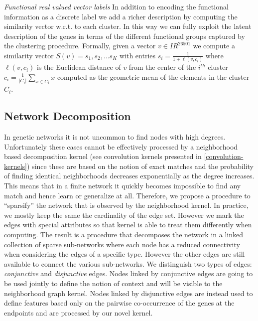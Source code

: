 \documentclass[review]{elsarticle}
\begin{document}
\textit{Functional real valued vector labels}
In addition to encoding the functional information as a discrete label we add a richer description by computing the similarity vector w.r.t. to each cluster. In this way we can fully exploit the latent description of the genes in terms of the different functional groups captured by the clustering procedure. Formally, given a vector $v \in I\!R^{26501}$ we compute a similarity vector $S(v)= {s_1, s_2, \ldots s_K}$ with entries $s_i = \frac{1}{1+ \ell(v,c_i)}$ where $\ell(v,c_i)$ is the Euclidean distance of $v$ from the center of the $i^{th}$ cluster $c_i = \frac{1}{|C_i|}\sum_{x \in C_i} x$ computed as the geometric mean of the elements in the cluster $C_i$.

\subsection{Network Decomposition} 
In genetic networks it is not uncommon to find nodes with high degrees. Unfortunately these cases cannot be effectively processed by a neighborhood based decomposition kernel (see convolution kernels presented in \ref{convolution-kernels}) since these are based on the notion of exact matches and the probability of finding identical neighborhoods decreases exponentially as the degree increases. This means that in a finite network it quickly becomes impossible to find any match and hence learn or generalize at all. Therefore, we propose a procedure to ``sparsify'' the network that is observed by the neighborhood kernel. In practice, we mostly keep the same the cardinality of the edge set. However we mark the edges with special attributes so that kernel is able to treat them differently when computing. The result is a procedure that decomposes the network in a linked collection of sparse sub-networks where each node has a reduced connectivity when considering the edges of a specific type. However the other edges are still available to connect the various sub-networks. We distinguish two types of edges: {\em conjunctive} and {\em disjunctive} edges. Nodes linked by conjunctive edges are going to be used jointly to define the notion of context and will be visible to the neighborhood graph kernel. Nodes linked by disjunctive edges are instead used to define features based only on the pairwise co-occurrence of the genes at the endpoints and are processed by our novel kernel.
\end{document}
